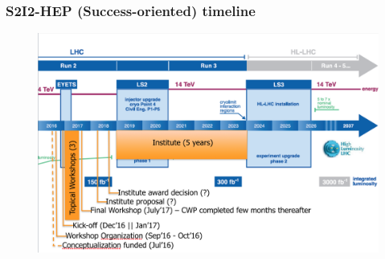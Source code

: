 \begin{frame}
\frametitle{S2I2-HEP (Success-oriented) timeline}

\begin{figure}[htbp]
\begin{center}
\includegraphics[width=1.0\textwidth]{images/s2i2-hep-timeline.png}
\end{center}
\end{figure}


\end{frame}


